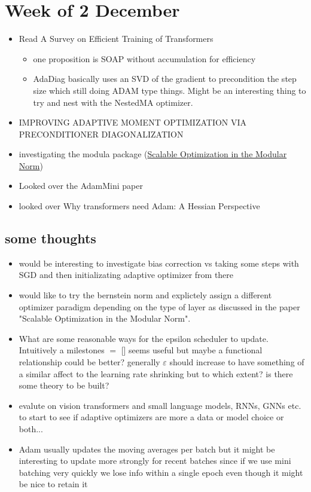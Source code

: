 \documentclass[12pt]{book}
\begin{document}
\section*{Week of 2 December}
\begin{itemize}
\item Read A Survey on Efficient Training of Transformers
	\begin{itemize}
	\item one proposition is SOAP without accumulation for efficiency
	\item AdaDiag basically uses an SVD of the gradient to precondition the step size which still doing ADAM type things. Might be an interesting thing to try and nest with the NestedMA optimizer.
	\end{itemize}
\item IMPROVING ADAPTIVE MOMENT OPTIMIZATION
VIA PRECONDITIONER DIAGONALIZATION
\item investigating the modula package (\href{https://github.com/modula-systems/modula}{Scalable Optimization in the Modular Norm})
\item Looked over the AdamMini paper
\item looked over Why transformers need Adam: A Hessian Perspective
\end{itemize}

\subsection*{some thoughts}
\begin{itemize}
\item would be interesting to investigate bias correction vs taking some steps with SGD and then initializating adaptive optimizer from there
\item would like to try the bernstein norm and explictely assign a different optimizer paradigm depending on the type of layer as discussed in the paper "Scalable Optimization in the Modular Norm". 
\item What are some reasonable ways for the epsilon scheduler to update. Intuitively a milestones $=$ [] seems useful but maybe a functional relationship could be better? 
generally $\varepsilon $ should increase to have something of a similar affect to the learning rate shrinking but to which extent? is there some theory to be built? 
\item evalute on vision transformers and small language models, RNNs, GNNs etc. to start to see if adaptive optimizers are more a data or model choice or both...
\item Adam usually updates the moving averages per batch but it might be interesting to update more strongly for recent batches since if we use mini batching very quickly we lose info within a single epoch even though it might be nice to retain it
\end{itemize}
\end{document}
